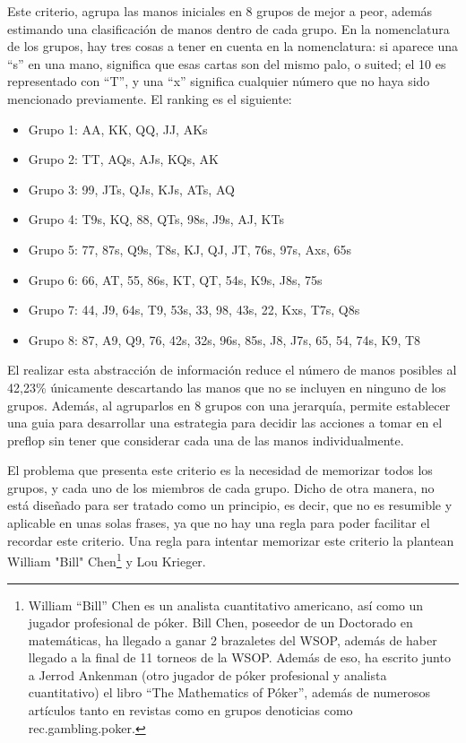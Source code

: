 Este criterio, agrupa las manos iniciales en 8 grupos de mejor a peor, además estimando una clasificación de manos dentro de cada grupo. En la nomenclatura de los grupos, hay tres cosas a tener en cuenta en la nomenclatura: si aparece una “s” en una mano, significa que esas cartas son del mismo palo, o suited; el 10 es representado con “T”, y una “x” significa cualquier número que no haya sido mencionado previamente. El ranking es el siguiente:
\begin{itemize}
\item Grupo 1: AA, KK, QQ, JJ, AKs
\item Grupo 2: TT, AQs, AJs, KQs, AK
\item Grupo 3: 99, JTs, QJs, KJs, ATs, AQ
\item Grupo 4: T9s, KQ, 88, QTs, 98s, J9s, AJ, KTs
\item Grupo 5: 77, 87s, Q9s, T8s, KJ, QJ, JT, 76s, 97s, Axs, 65s
\item Grupo 6: 66, AT, 55, 86s, KT, QT, 54s, K9s, J8s, 75s
\item Grupo 7: 44, J9, 64s, T9, 53s, 33, 98, 43s, 22, Kxs, T7s, Q8s
\item Grupo 8: 87, A9, Q9, 76, 42s, 32s, 96s, 85s, J8, J7s, 65, 54, 74s, K9, T8
\end{itemize}

El realizar esta abstracción de información reduce el número de manos posibles al 42,23\% únicamente descartando las manos que no se incluyen en ninguno de los grupos. Además, al agruparlos en 8 grupos con una jerarquía, permite establecer una guia para desarrollar una estrategia para decidir las acciones a tomar en el preflop sin tener que considerar cada una de las manos individualmente.

El problema que presenta este criterio es la necesidad de memorizar todos los grupos, y cada uno de los miembros de cada grupo. Dicho de otra manera, no está diseñado para ser tratado como un principio, es decir, que no es resumible y aplicable en unas solas frases, ya que no hay una regla para poder facilitar el recordar este criterio.
Una regla para intentar memorizar este criterio la plantean William "Bill" Chen\footnote{William “Bill” Chen es un analista cuantitativo americano, así como un jugador profesional de póker. Bill Chen, poseedor de un Doctorado en matemáticas, ha llegado a ganar 2 brazaletes del WSOP, además de haber llegado a la final de 11 torneos de la WSOP. Además de eso, ha escrito junto a Jerrod Ankenman (otro jugador de póker profesional y analista cuantitativo) el libro “The Mathematics of Póker”, además de numerosos artículos tanto en revistas como en grupos denoticias como rec.gambling.poker.} y Lou Krieger.\cite{krieger}

